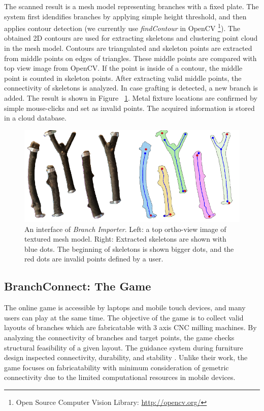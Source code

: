 The scanned result is a mesh model representing branches with a fixed plate.
The system first idendifies branches by applying simple height threshold, and then applies contour detection (we currently use \textit{findContour} in OpenCV \footnote{Open Source Computer Vision Library: \url{http://opencv.org/} }).
The obtained 2D contours are used for extracting skeletons and clustering point cloud in the mesh model.
Contours are triangulated and skeleton points are extracted from middle points on edges of triangles.
These middle points are compared with top view image from OpenCV.
If the point is inside of a contour, the middle point is counted in skeleton points.
After extracting valid middle points, the connectivity of skeletons is analyzed. In case grafting is detected, a new branch is added. 
The result is shown in Figure ~\ref{fig:skeleton}.
Metal fixture locations are confirmed by simple mouse-clicks and set as invalid points.
The acquired information is stored in a cloud database.

\begin{figure}[ht]
  \includegraphics[width = 0.4\paperwidth]{images/importer/importer.png}
  \caption{An interface of \textit{Branch Importer}. Left: a top ortho-view image of textured mesh model. Right: Extracted skeletons are shown with blue dots. The beginning of skeletons is shown bigger dots, and the red dots are invalid points defined by a user. }
  \label{fig:skeleton}
\end{figure}


\subsection{BranchConnect: The Game}
The online game is accessible by laptops and mobile touch devices, and many users can play at the same time.
The objective of the game is to collect valid layouts of branches which are fabricatable with 3 axis CNC milling machines.
By analyzing the connectivity of branches and target points, the game checks structural feasibility of a given layout. 
The guidance system during furniture design inspected connectivity, durability, and stability \cite{umetani2012guided}. 
Unlike their work, the game focuses on fabricatability with minimum consideration of gemetric connectivity due to the limited computational resources in mobile devices. 


